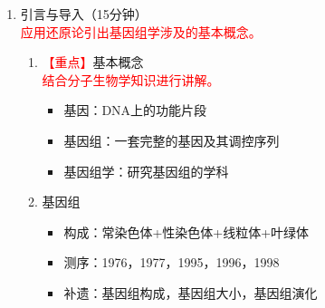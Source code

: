 \documentclass{TIJMUjiaoanLL}
\begin{document}
\newpage
\otherHeader

\begin{enumerate}
  \item 引言与导入（15分钟）\\
    \textcolor{red}{应用还原论引出基因组学涉及的基本概念。}
    \begin{enumerate}
      \item \textcolor{red}{【重点】}基本概念\\
        \textcolor{red}{结合分子生物学知识进行讲解。}
        \begin{itemize}
          \item 基因：DNA上的功能片段
          \item 基因组：一套完整的基因及其调控序列
          \item 基因组学：研究基因组的学科
        \end{itemize}
      \item 基因组
        \begin{itemize}
          \item 构成：常染色体+性染色体+线粒体+叶绿体
          \item 测序：1976，1977，1995，1996，1998
          \item 补遗：基因组构成，基因组大小，基因组演化
        \end{itemize}
    \end{enumerate}


\end{enumerate}
\end{document}
